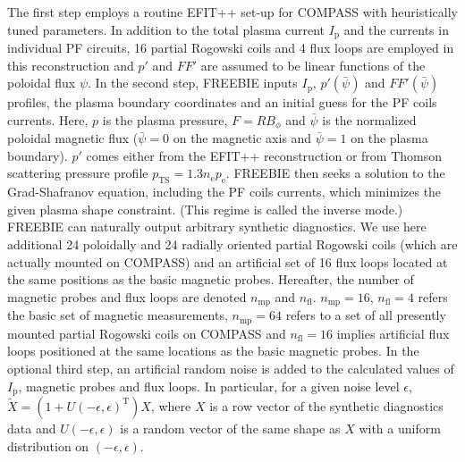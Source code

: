 The first step employs a routine EFIT++ set-up for COMPASS with heuristically tuned parameters. In addition to the total plasma current $I_\mathrm{p}$ and the currents in individual PF circuits, 16 partial Rogowski coils and 4 flux loops are employed in this reconstruction and $p'$ and $FF'$ are assumed to be linear functions of the poloidal flux $\psi$.
In the second step, FREEBIE inputs $I_\mathrm{p}$, $p'\left( {\bar \psi } \right)$ and $FF'\left( {\bar \psi } \right)$ profiles, the plasma boundary coordinates and an initial guess for the PF coils currents. Here, $p$ is the plasma pressure, $F = RB_\phi$ and $\bar\psi$ is the normalized poloidal magnetic flux ($\bar\psi = 0$ on the magnetic axis and $\bar\psi = 1$ on the plasma boundary). $p'$ comes either from the EFIT++ reconstruction or from Thomson scattering pressure profile $p_\mathrm{TS} = 1.3 n_\mathrm{e} p_\mathrm{e}$. FREEBIE then seeks a solution to the Grad-Shafranov equation, including the PF coils currents, which minimizes the given plasma shape constraint. (This regime is called the inverse mode.) FREEBIE can naturally output arbitrary synthetic diagnostics. We use here additional 24 poloidally and 24 radially oriented partial Rogowski coils (which are actually mounted on COMPASS) and an artificial set of 16 flux loops located at the same positions as the basic magnetic probes. Hereafter, the number of magnetic probes and flux loops are denoted $n_\mathrm{mp}$ and $n_\mathrm{fl}$. $n_\mathrm{mp}=16$, $n_\mathrm{fl}=4$ refers the basic set of magnetic measurements, $n_\mathrm{mp}=64$ refers to a set of all presently mounted partial Rogowski coils on COMPASS and $n_\mathrm{fl}=16$ implies artificial flux loops positioned at the same locations as the basic magnetic probes.
In the optional third step, an artificial random noise is added to the calculated values of $I_\mathrm{p}$, magnetic probes and flux loops. In particular, for a given noise level $\epsilon$, $\tilde X = \left( {1 + U\left( { - \epsilon, \epsilon} \right)^\mathrm{T}} \right)X$, where $X$ is a row vector of the synthetic diagnostics data and $U\left( { - \epsilon, \epsilon} \right)$ is a random vector of the same shape as $X$ with a uniform distribution on $\left( { - \epsilon, \epsilon} \right)$.

